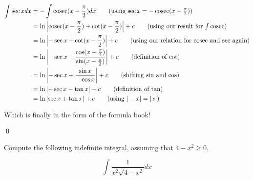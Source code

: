 \begin{solution}
    \begin{align*}
        \int \sec x dx&= - \int \cosec (x- \frac{\pi}{2}) dx \tag{using $\sec x = -\cosec (x - \frac{\pi}{2})$}\\
         &= \ln \left| \cosec (x - \frac{\pi}{2}) + \cot(x - \frac{\pi}{2}) \right| +c \tag{using our result for $\int \cosec$}\\
         &= \ln \left| - \sec x + \cot(x - \frac{\pi}{2}) \right| +c \tag{using our relation for $\cosec$ and $\sec$ again}\\
         &= \ln \left| - \sec x + \frac{\cos(x - \frac{\pi}{2})}{\sin(x - \frac{\pi}{2})} \right| +c \tag{definition of $\cot$}\\
         &= \ln \left| - \sec x + \frac{\sin x}{-\cos x } \right| +c \tag{shifting $\sin$ and $\cos$}\\
         &= \ln \left| - \sec x - \tan x \right| +c \tag{definition of $\tan$} \\
         &= \ln \left| \sec x + \tan x \right| +c \tag{using $|-x| = |x|$}
    \end{align*}

    Which is finally in the form of the formula book!

    \qed
\end{solution}


\begin{example}
    Compute the following indefinite integral, assuming that $4-x^2\geq 0$.

    \[ \int \frac{1}{x^2 \sqrt{4 - x^2}}dx\]
\end{example}

